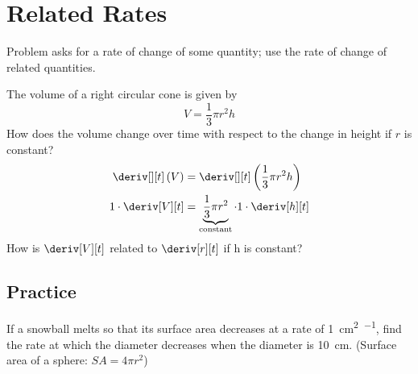 
\section{Related Rates}
Problem asks for a rate of change of some quantity; use the rate of change of related quantities.
\begin{example}
    The volume of a right circular cone is given by
    \begin{equation*}
        V = \dfrac{1}{3}\pi r^2h
    \end{equation*}
    How does the volume change over time with respect to the change in height if $r$ is constant?
    \begin{align*}
        \deriv[][t]\left(V\right) &= \deriv[][t]\left(\dfrac{1}{3}\pi r^2 h\right) \\
        1 \cdot \deriv[V][t] &= \underbrace{\dfrac{1}{3}\pi r^2}_\text{constant} \cdot 1 \cdot \deriv[h][t]
    \end{align*}
    How is $\deriv[V][t]$ related to $\deriv[r][t]$ if h is constant?

\end{example}
\subsection{Practice}
If a snowball melts so that its surface area decreases at a rate of \SI{1}{\cm\squared\per\min}, find the rate at which the diameter decreases when the diameter is \SI{10}{\cm}. (Surface area of a sphere: $SA = 4\pi r^2$)\\
